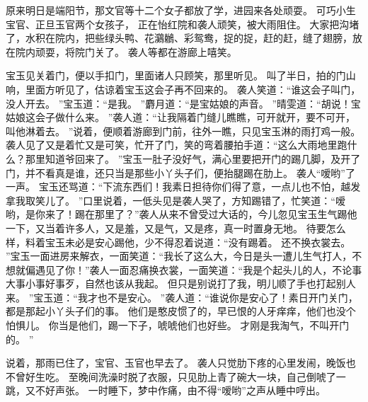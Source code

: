 \par
原来明日是端阳节，那文官等十二个女子都放了学，进园来各处顽耍。
可巧小生宝官、正旦玉官两个女孩子，
正在怡红院和袭人顽笑，被大雨阻住。
大家把沟堵了，水积在院内，把些绿头鸭、花鸂鶒、彩鸳鸯，捉的捉，赶的赶，缝了翅膀，放在院内顽耍，将院门关了。
袭人等都在游廊上嘻笑。
\par
宝玉见关着门，便以手扣门，里面诸人只顾笑，那里听见。
叫了半日，拍的门山响，里面方听见了，估谅着宝玉这会子再不回来的。
袭人笑道：“谁这会子叫门，没人开去。
”宝玉道：“是我。
”麝月道：“是宝姑娘的声音。
”晴雯道：“胡说！宝姑娘这会子做什么来。
”袭人道：“让我隔着门缝儿瞧瞧，可开就开，要不可开，叫他淋着去。
”说着，便顺着游廊到门前，往外一瞧，只见宝玉淋的雨打鸡一般。
袭人见了又是着忙又是可笑，忙开了门，笑的弯着腰拍手道：“这么大雨地里跑什么？那里知道爷回来了。
”宝玉一肚子没好气，满心里要把开门的踢几脚，及开了门，并不看真是谁，还只当是那些小丫头子们，便抬腿踢在肋上。
袭人“嗳哟”了一声。
宝玉还骂道：“下流东西们！我素日担待你们得了意，一点儿也不怕，越发拿我取笑儿了。
”口里说着，一低头见是袭人哭了，方知踢错了，忙笑道：“嗳哟，是你来了！踢在那里了？”袭人从来不曾受过大话的，今儿忽见宝玉生气踢他一下，又当着许多人，又是羞，又是气，又是疼，真一时置身无地。
待要怎么样，料着宝玉未必是安心踢他，少不得忍着说道：“没有踢着。
还不换衣裳去。
”宝玉一面进房来解衣，一面笑道：“我长了这么大，今日是头一遭儿生气打人，不想就偏遇见了你！”袭人一面忍痛换衣裳，一面笑道：“我是个起头儿的人，不论事大事小事好事歹，自然也该从我起。
但只是别说打了我，明儿顺了手也打起别人来。
”宝玉道：“我才也不是安心。
”袭人道：“谁说你是安心了！素日开门关门，都是那起小丫头子们的事。
他们是憨皮惯了的，早已恨的人牙痒痒，他们也没个怕惧儿。
你当是他们，踢一下子，唬唬他们也好些。
才刚是我淘气，不叫开门的。
”\par
说着，那雨已住了，宝官、玉官也早去了。
袭人只觉肋下疼的心里发闹，晚饭也不曾好生吃。
至晚间洗澡时脱了衣服，只见肋上青了碗大一块，自己倒唬了一跳，又不好声张。
一时睡下，梦中作痛，由不得“嗳哟”之声从睡中哼出。
